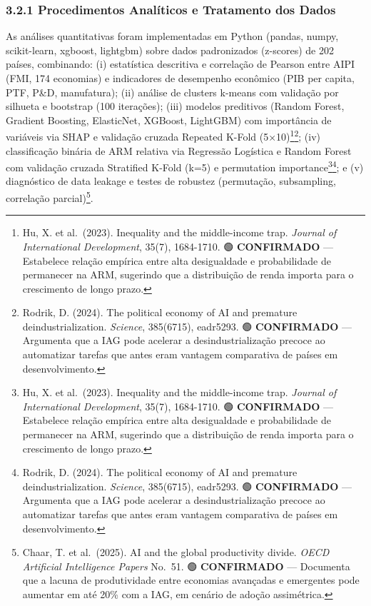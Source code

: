 \documentclass[
  brazilian,
  12pt,
]{article}
\begin{document}
\subsubsection{3.2.1 Procedimentos Analíticos e Tratamento dos Dados}\label{procedimentos-analuxedticos-e-tratamento-dos-dados}

As análises quantitativas foram implementadas em Python (pandas, numpy, scikit-learn, xgboost, lightgbm) sobre dados padronizados (z-scores) de 202 países, combinando: (i) estatística descritiva e correlação de Pearson entre AIPI (FMI, 174 economias) e indicadores de desempenho econômico (PIB per capita, PTF, P\&D, manufatura); (ii) análise de clusters k-means com validação por silhueta e bootstrap (100 iterações); (iii) modelos preditivos (Random Forest, Gradient Boosting, ElasticNet, XGBoost, LightGBM) com importância de variáveis via SHAP e validação cruzada Repeated K-Fold (5×10)\footnote{Hu, X. et al.~(2023). Inequality and the middle-income trap. \emph{Journal of International Development}, 35(7), 1684-1710. 🟢 \textbf{CONFIRMADO} --- Estabelece relação empírica entre alta desigualdade e probabilidade de permanecer na ARM, sugerindo que a distribuição de renda importa para o crescimento de longo prazo.}\footnote{Rodrik, D. (2024). The political economy of AI and premature deindustrialization. \emph{Science}, 385(6715), eadr5293. 🟢 \textbf{CONFIRMADO} --- Argumenta que a IAG pode acelerar a desindustrialização precoce ao automatizar tarefas que antes eram vantagem comparativa de países em desenvolvimento.}; (iv) classificação binária de ARM relativa via Regressão Logística e Random Forest com validação cruzada Stratified K-Fold (k=5) e permutation importance\footnote{Hu, X. et al.~(2023). Inequality and the middle-income trap. \emph{Journal of International Development}, 35(7), 1684-1710. 🟢 \textbf{CONFIRMADO} --- Estabelece relação empírica entre alta desigualdade e probabilidade de permanecer na ARM, sugerindo que a distribuição de renda importa para o crescimento de longo prazo.}\footnote{Rodrik, D. (2024). The political economy of AI and premature deindustrialization. \emph{Science}, 385(6715), eadr5293. 🟢 \textbf{CONFIRMADO} --- Argumenta que a IAG pode acelerar a desindustrialização precoce ao automatizar tarefas que antes eram vantagem comparativa de países em desenvolvimento.}; e (v) diagnóstico de data leakage e testes de robustez (permutação, subsampling, correlação parcial)\footnote{Chaar, T. et al.~(2025). AI and the global productivity divide. \emph{OECD Artificial Intelligence Papers} No.~51. 🟢 \textbf{CONFIRMADO} --- Documenta que a lacuna de produtividade entre economias avançadas e emergentes pode aumentar em até 20\% com a IAG, em cenário de adoção assimétrica.}.
\end{document}
